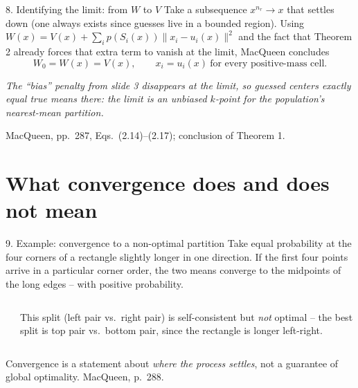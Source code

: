 \documentclass[10pt,compress]{beamer}
\newcommand{\norm}[1]{\lVert #1\rVert}
\newcommand{\defline}[1]{{\footnotesize\textcolor{aggiemaroon}{\textit{#1}}\par}}
\begin{document}
\begin{frame}{8. Identifying the limit: from $W$ to $V$}
Take a subsequence $x^{n_r}\to x$ that settles down (one always exists since guesses live in a bounded region). Using $W(x)=V(x)+\sum_i p(S_i(x))\norm{x_i-u_i(x)}^2$ and the fact that Theorem 2 already forces that extra term to vanish at the limit, MacQueen concludes
\[
W_0=W(x)=V(x),\qquad x_i=u_i(x)\ \text{for every positive-mass cell.}
\]
\defline{The ``bias'' penalty from slide 3 disappears at the limit, so guessed centers exactly equal true means there: the limit is an unbiased $k$-point for the population's nearest-mean partition.}
\vfill
{\scriptsize MacQueen, pp.~287, Eqs.~(2.14)--(2.17); conclusion of Theorem 1.}
\end{frame}

\section[Caveats]{What convergence does and does not mean}

\begin{frame}{9. Example: convergence to a non-optimal partition}
\small Take equal probability at the four corners of a rectangle slightly longer in one direction. If the first four points arrive in a particular corner order, the two means converge to the midpoints of the long edges -- with positive probability.
\begin{columns}[T]
\begin{center}
\end{center}
\footnotesize This split (left pair vs.\ right pair) is self-consistent but \emph{not} optimal -- the best split is top pair vs.\ bottom pair, since the rectangle is longer left-right.
\end{columns}
\small Convergence is a statement about \emph{where the process settles}, not a guarantee of global optimality.
\vfill
{\scriptsize MacQueen, p.~288.}
\end{frame}
\end{document}
